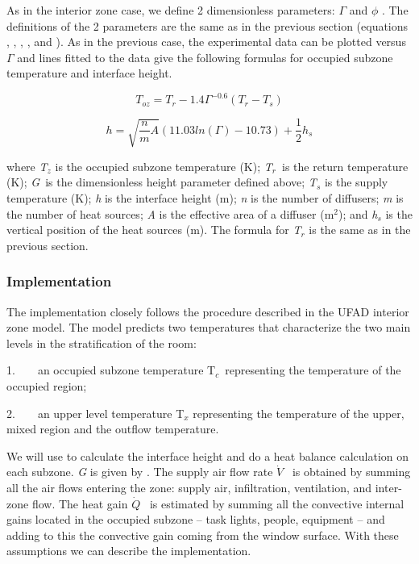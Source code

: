 As in the interior zone case, we define 2 dimensionless parameters: \(\Gamma\) and \(\phi\) . The definitions of the 2 parameters are the same as in the previous section (equations , , , , and ). As in the previous case, the experimental data can be plotted versus \(\Gamma\) and lines fitted to the data give the following formulas for occupied subzone temperature and interface height.

\begin{equation}
{T_{oz}} = {T_r} - 1.4{\Gamma ^{ - 0.6}}({T_r} - {T_s})
\end{equation}

\begin{equation}
h = \sqrt {\frac{n}{m}A} (11.03ln(\Gamma ) - 10.73) + \frac{1}{2}{h_s}
\end{equation}

where \emph{T\(_{z}\)} is the occupied subzone temperature (K); \emph{T\(_{r}\)}~is the return temperature (K); \emph{G}~is the dimensionless height parameter defined above; \emph{T\(_{s}\)} is the supply temperature (K); \emph{h} is the interface height (m); \emph{n} is the number of diffusers; \emph{m} is the number of heat sources; \emph{A} is the effective area of a diffuser (m\(^{2}\)); and \emph{h\(_{s}\)} is the vertical position of the heat sources (m). The formula for \emph{T\(_{r}\)} is the same as in the previous section.

\subsubsection{Implementation}\label{implementation-2}

The implementation closely follows the procedure described in the UFAD interior zone model. The model predicts two temperatures that characterize the two main levels in the stratification of the room:

1.~~~~an occupied subzone temperature T\(_{c}\)~representing the temperature of the occupied region;

2.~~~~an upper level temperature T\(_{x}\) representing the temperature of the upper, mixed region and the outflow temperature.

We will use to calculate the interface height and do a heat balance calculation on each subzone. \emph{G} is given by . The supply air flow rate \(\dot V\) ~is obtained by summing all the air flows entering the zone: supply air, infiltration, ventilation, and inter-zone flow. The heat gain \(\dot Q\) ~is estimated by summing all the convective internal gains located in the occupied subzone -- task lights, people, equipment -- and adding to this the convective gain coming from the window surface. With these assumptions we can describe the implementation.

